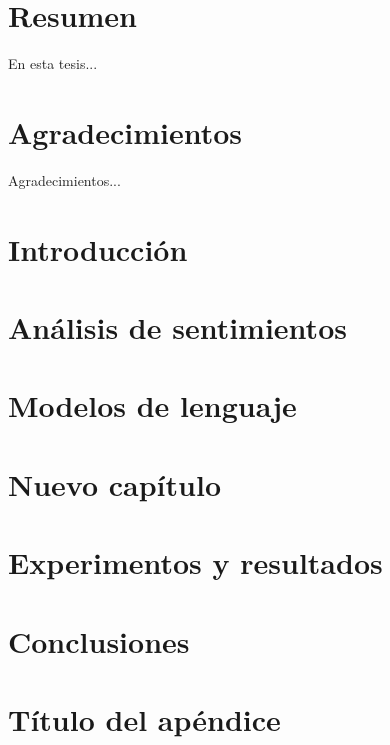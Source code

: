 \documentclass[12pt,twoside]{report}
\begin{document}


\chapter*{Resumen}

En esta tesis...

\newpage

\chapter*{Agradecimientos}

Agradecimientos...

\newpage

\tableofcontents
{}

\newpage



\chapter{Introducción}


\chapter{Análisis de sentimientos}


\chapter{Modelos de lenguaje}


\chapter{Nuevo capítulo}


\chapter{Experimentos y resultados}


\chapter{Conclusiones}


\appendix
\chapter{Título del apéndice}


\printbibliography
{}

\newpage

\listoffigures
{}

\newpage

\listoftables
{}
\end{document}
